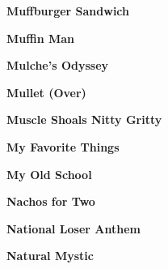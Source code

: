 \begin{center}\textbf{Muffburger Sandwich}\end{center}
\newline
\vspace{10pt} 
\begin{center}\textbf{Muffin Man}\end{center}
\newline
\vspace{10pt} 
\begin{center}\textbf{Mulche's Odyssey}\end{center}
\newline
\vspace{10pt} 
\begin{center}\textbf{Mullet (Over)}\end{center}
\newline
\vspace{10pt} 
\begin{center}\textbf{Muscle Shoals Nitty Gritty}\end{center}
\newline
\vspace{10pt} 
\begin{center}\textbf{My Favorite Things}\end{center}
\newline
\vspace{10pt} 
\begin{center}\textbf{My Old School}\end{center}
\newline
\vspace{10pt} 
\begin{center}\textbf{Nachos for Two}\end{center}
\newline
\vspace{10pt} 
\begin{center}\textbf{National Loser Anthem}\end{center}
\newline
\vspace{10pt} 
\begin{center}\textbf{Natural Mystic}\end{center}
